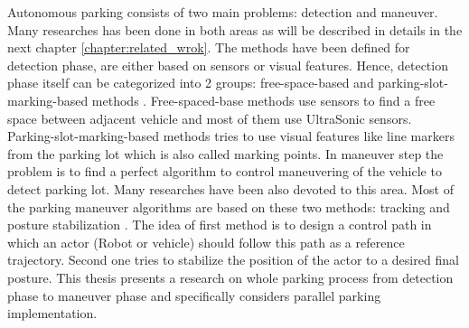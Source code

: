 Autonomous parking consists of two main problems: detection and maneuver. Many researches has been done in both areas as will be described in details in the next chapter \ref{chapter:related_wrok}. The methods have been defined for detection phase, are either based on sensors or visual features. Hence, detection phase itself can be categorized into 2 groups: free-space-based and parking-slot-marking-based methods \cite{markingPointConf}. Free-spaced-base methods use sensors to find a free space between adjacent vehicle and most of them use UltraSonic sensors. Parking-slot-marking-based methods tries to use visual features like line markers from the parking lot which is also called marking points. In maneuver step the problem is to find a perfect algorithm to control maneuvering of the vehicle to detect parking lot. Many researches have been also devoted to this area. Most of the parking maneuver algorithms are based on these two methods: tracking and posture stabilization \cite{fuzzy}. The idea of first method is to design a control path in which an actor (Robot or vehicle) should follow this path as a reference trajectory. Second one tries to stabilize the position of the actor to a desired final posture. This thesis presents a research on whole parking process from detection phase to maneuver phase and specifically considers parallel parking implementation. 
